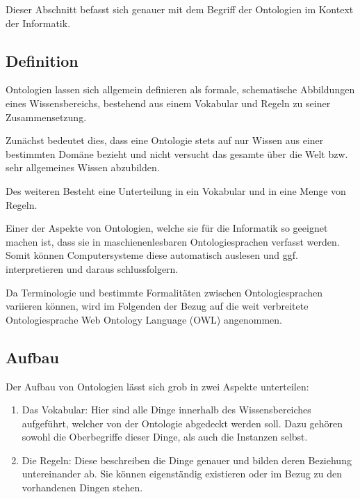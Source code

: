 \documentclass[12pt]{report}
\begin{document}
Dieser Abschnitt befasst sich genauer mit dem Begriff der Ontologien im Kontext der Informatik. 

\subsection{Definition}
Ontologien lassen sich allgemein definieren als \glqq formale, schematische Abbildungen eines Wissensbereichs, bestehend aus einem Vokabular und Regeln zu seiner Zusammensetzung\grqq \cite{we13}.

Zunächst bedeutet dies, dass eine Ontologie stets auf nur Wissen aus einer bestimmten Domäne bezieht und nicht versucht das gesamte über die Welt bzw. sehr allgemeines Wissen abzubilden. 

Des weiteren Besteht eine Unterteilung in ein Vokabular und in eine Menge von Regeln. 

Einer der Aspekte von Ontologien, welche sie für die Informatik so geeignet machen ist, dass sie in maschienenlesbaren Ontologiesprachen verfasst werden. Somit können Computersysteme diese automatisch auslesen und ggf. interpretieren und daraus schlussfolgern. 

Da Terminologie und bestimmte Formalitäten zwischen Ontologiesprachen variieren können, wird im Folgenden der Bezug auf die weit verbreitete Ontologiesprache \glqq Web Ontology Language\grqq{} (OWL) angenommen.

\subsection{Aufbau}
Der Aufbau von Ontologien lässt sich grob in zwei Aspekte unterteilen: 

\begin{enumerate}
\item Das Vokabular: Hier sind alle Dinge innerhalb des Wissensbereiches aufgeführt, welcher von der Ontologie abgedeckt werden soll. Dazu gehören sowohl die Oberbegriffe dieser Dinge, als auch die Instanzen selbst. 
\item Die Regeln: Diese beschreiben die Dinge genauer und bilden deren Beziehung untereinander ab. Sie können eigenständig existieren oder im Bezug zu den vorhandenen Dingen stehen. 
\end{enumerate}
\end{document}

